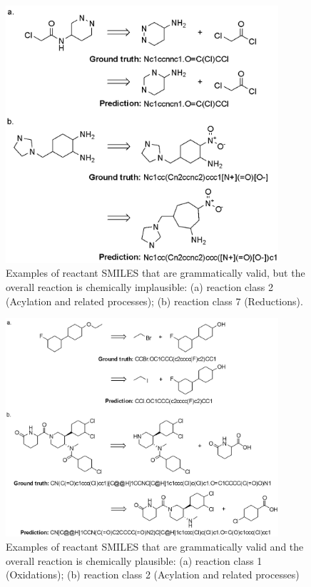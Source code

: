 \begin{figure}
  \centering
  \includegraphics[width=0.9\textwidth]{Images/ret_seq2seq_implausible.png}
  \caption{Examples of reactant SMILES that are grammatically valid, but the overall reaction is chemically implausible: (a) reaction class 2 (Acylation and related processes); (b) reaction class 7 (Reductions).}
  \label{fig:ret_table2}
\end{figure}

\begin{figure}
  \centering
  \includegraphics[width=0.9\textwidth]{Images/ret_seq2seq_plausible.png}
  \caption{Examples of reactant SMILES that are grammatically valid and the overall reaction is chemically plausible: (a) reaction class 1 (Oxidations); (b) reaction class 2 (Acylation and related processes)}
  \label{fig:ret_table2}
\end{figure}


